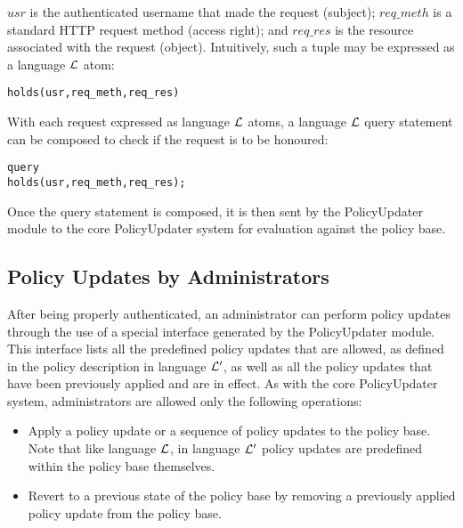 \documentclass[global,twocolumn,final]{svjour}
\newenvironment{vverbatim}
  {\begin{alltt}}
  {\vspace{-\baselineskip}\end{alltt}}
\begin{document}
      $usr$ is the authenticated username that made the request (subject);
      $req\_meth$ is a standard HTTP request method (access right); and
      $req\_res$ is the resource associated with the request (object).
      Intuitively, such a tuple may be expressed as a language ${\cal L}$ atom:

      \begin{vverbatim}
  holds(usr, req\_meth, req\_res)
      \end{vverbatim}

      With each request expressed as language ${\cal L}$ atoms, a language
      ${\cal L}$ query statement can be composed to check if the request is
      to be honoured:

      \begin{vverbatim}
  query
    holds(usr, req\_meth, req\_res);
      \end{vverbatim}

      Once the query statement is composed, it is then sent by the
      PolicyUpdater module to the core PolicyUpdater system for evaluation
      against the policy base.

    \subsection{Policy Updates by Administrators}

      After being properly authenticated, an administrator can perform policy
      updates through the use of a special interface generated by the
      PolicyUpdater module. This interface lists all the predefined policy
      updates that are allowed, as defined in the policy description in
      language ${\cal L'}$, as well as all the policy updates that have been
      previously applied and are in effect. As with the core PolicyUpdater
      system, administrators are allowed only the following operations:

      \begin{itemize}
        \item
          Apply a policy update or a sequence of policy updates to the policy
          base. Note that like language ${\cal L}$, in language ${\cal L'}$
          policy updates are predefined within the policy base themselves.
        \item
          Revert to a previous state of the policy base by removing a
          previously applied policy update from the policy base.
      \end{itemize}
\end{document}
